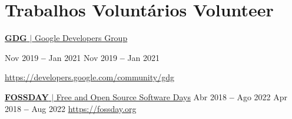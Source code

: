 \section{
    {Trabalhos Voluntários}
    {Volunteer}
  }
  \vspace{3pt}
  \resumeSubHeadingListStart

    \resumeSubheading
      {\href{https://developers.google.com/community/gdg}{\color{blue}\textbf{GDG} $|$ Google Developers Group}}%
      {%
          {Nov 2019 \textbf{--} Jan 2021}
          {Nov 2019 \textbf{--} Jan 2021}

      }{}
      {\small{\href{https://developers.google.com/community/gdg}{https://developers.google.com/community/gdg}}}

    \resumeSubheading
      {\href{https://fossday.org}{\color{blue}\textbf{FOSSDAY} $|$ Free and Open Source Software Days}}
      {%
          {Abr 2018 \textbf{--} Ago 2022}
          {Apr 2018 \textbf{--} Aug 2022}
      }{}
      {\small{\href{https://fossday.org}{https://fossday.org}}}

  \resumeSubHeadingListEnd
